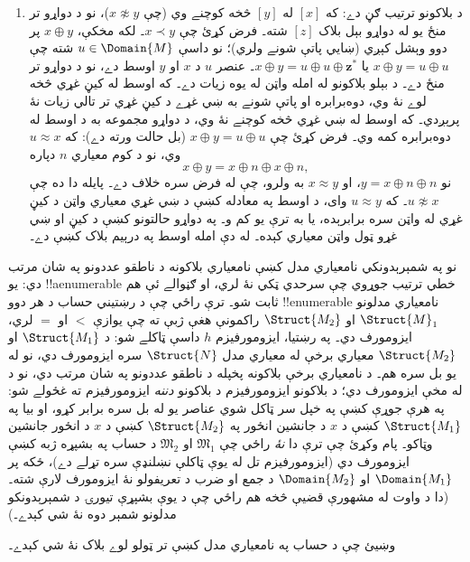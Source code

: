 \documentclass[../../../include/open-logic-section]{subfiles}
\begin{document}
\begin{enumerate}
\item د بلاکونو ترتيب ګڼ دے: که $[x]$ له $[y]$ څخه کوچنے وي (چې $x \not\approx y$)، نو د دواړو تر منځ يو له دواړو بېل بلاک $[z]$ شته۔ فرض کړئ چې $x \prec y$۔ لکه مخکې، $x \oplus y$ پر دوو وېشل کېږي (ښايي پاتې شونے ولري)؛ نو داسې $u \in \Domain{M}$ شته چې $x \oplus y = u \oplus u$ يا $x
  \oplus y = u \oplus u \oplus \mathbf{z}^*$۔ عنصر $u$ د $x$ او $y$ اوسط دے، نو د دواړو تر منځ دے۔ د بېلو بلاکونو له امله واټن له يوه زيات دے۔ که اوسط له کيڼ غړي څخه لوے نۀ وي، دوه‌برابره او پاتې شونے به ښي غړے د کيڼ غړي تر تالي زيات نۀ پرېږدي۔ که اوسط له ښي غړي څخه کوچنے نۀ وي، د دواړو مجموعه به د اوسط له دوه‌برابره کمه وي۔ فرض کړئ چې $x \oplus y = u \oplus u$ (بل حالت ورته دے): که $u \approx x$ وي، نو د کوم معياري $n$ دپاره
  \[
  x \oplus y = x \oplus n \oplus x \oplus n,
  \]
  نو $y = x \oplus n \oplus n$، او $x \approx y$ به ولرو، چې له فرض سره خلاف دے۔ پايله دا ده چې $u \not\approx x$۔ که $u \approx y$ وای، د اوسط په معادله کښې د ښي غړي معياري واټن د کيڼ غړي له واټن سره برابرېده، يا به ترې يو کم و۔ په دواړو حالتونو کښې د کيڼ او ښي غړو ټول واټن معياري کېده۔ له دې امله اوسط په درېيم بلاک کښې دے۔
\end{enumerate}
نو په شمېرېدونکي نامعياري مدل کښې نامعياري بلاکونه د ناطقو عددونو په شان مرتب دي: يو !!a{enumerable} خطي ترتيب جوړوي چې سرحدي ټکي نۀ لري، او ګڼوالے ئې هم ثابت شو۔ ترې راځي چې د رښتيني حساب د هر دوو !!{enumerable} نامعياري مدلونو $\Struct{M}_1$ او $\Struct{M_2}$ راکمونې هغې ژبې ته چې يوازې $<$ او $=$ لري، ايزومورف دي۔ په رښتيا، ايزومورفيزم $h$ داسې ټاکلے شو: د $\Struct{M_1}$ او $\Struct{M_2}$ معياري برخې له معياري مدل $\Struct{N}$ سره ايزومورف دي، نو له يو بل سره هم۔ د نامعياري برخې بلاکونه پخپله د ناطقو عددونو په شان مرتب دي، نو د  له مخې ايزومورف دي؛ د بلاکونو ايزومورفيزم د بلاکونو \emph{دننه} ايزومورفيزم ته غځولے شو: په هرې جوړې کښې په خپل سر ټاکل شوي عناصر يو له بل سره برابر کړو، او بيا په $\Struct{M_1}$ کښې د $x$ د جانشين انځور په $\Struct{M_2}$ کښې د $x$ د انځور جانشين وټاکو۔ پام وکړئ چې ترې دا \emph{نۀ} راځي چې $\mathfrak{M}_1$ او $\mathfrak{M}_2$ د حساب په بشپړه ژبه کښې ايزومورف دي (ايزومورفيزم تل له يوې ټاکلې نښلنډې سره تړلے دے)، ځکه پر $\Domain{M_1}$ او $\Domain{M_2}$ د جمع او ضرب د تعريفولو نۀ ايزومورف لارې شته۔ (دا د واوت له مشهورې قضيې څخه هم راځي چې د يوې بشپړې تيورۍ د شمېرېدونکو مدلونو شمېر دوه نۀ شي کېدے۔)

\begin{prob}
وښيئ چې د حساب په نامعياري مدل کښې تر ټولو لوے بلاک نۀ شي کېدے۔
\end{prob}
\end{document}
